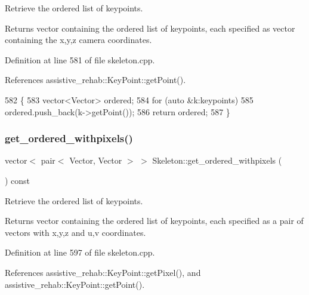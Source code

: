 Retrieve the ordered list of keypoints. 

\begin{DoxyReturn}{Returns}
vector containing the ordered list of keypoints, each specified as vector containing the x,y,z camera coordinates. 
\end{DoxyReturn}


Definition at line 581 of file skeleton.\+cpp.



References assistive\+\_\+rehab\+::\+Key\+Point\+::get\+Point().


\begin{DoxyCode}
582 \{
583     vector<Vector> ordered;
584     \textcolor{keywordflow}{for} (\textcolor{keyword}{auto} &k:keypoints)
585         ordered.push\_back(k->getPoint());
586     \textcolor{keywordflow}{return} ordered;
587 \}
\end{DoxyCode}
\mbox{\label{classassistive__rehab_1_1Skeleton_a270506cde494cb4261c7892edb46ce53}} 
\subsubsection{\texorpdfstring{get\+\_\+ordered\+\_\+withpixels()}{get\_ordered\_withpixels()}}
{\footnotesize\ttfamily vector$<$ pair$<$ Vector, Vector $>$ $>$ Skeleton\+::get\+\_\+ordered\+\_\+withpixels (\begin{DoxyParamCaption}{ }\end{DoxyParamCaption}) const\hspace{0.3cm}{\ttfamily [virtual]}}



Retrieve the ordered list of keypoints. 

\begin{DoxyReturn}{Returns}
vector containing the ordered list of keypoints, each specified as a pair of vectors with x,y,z and u,v coordinates. 
\end{DoxyReturn}


Definition at line 597 of file skeleton.\+cpp.



References assistive\+\_\+rehab\+::\+Key\+Point\+::get\+Pixel(), and assistive\+\_\+rehab\+::\+Key\+Point\+::get\+Point().


